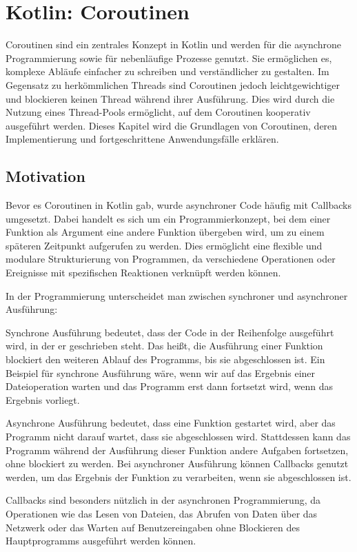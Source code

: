 \documentclass[fontsize=12pt,paper=a4,twoside=semi,parskip=half-,headsepline,headinclude]{scrreprt}
\begin{document}
\section{Kotlin: Coroutinen}

Coroutinen sind ein zentrales Konzept in Kotlin und werden für die asynchrone Programmierung sowie für nebenläufige Prozesse genutzt. Sie ermöglichen es, komplexe Abläufe einfacher zu schreiben und verständlicher zu gestalten. Im Gegensatz zu herkömmlichen Threads sind Coroutinen jedoch leichtgewichtiger und blockieren keinen Thread während ihrer Ausführung. Dies wird durch die Nutzung eines Thread-Pools ermöglicht, auf dem Coroutinen kooperativ ausgeführt werden. Dieses Kapitel wird die Grundlagen von Coroutinen, deren Implementierung und fortgeschrittene Anwendungsfälle erklären.

\subsection{Motivation}

Bevor es Coroutinen in Kotlin gab, wurde asynchroner Code häufig mit Callbacks umgesetzt. Dabei handelt es sich um ein Programmierkonzept, bei dem einer Funktion als Argument eine andere Funktion übergeben wird, um zu einem späteren Zeitpunkt aufgerufen zu werden. Dies ermöglicht eine flexible und modulare Strukturierung von Programmen, da verschiedene Operationen oder Ereignisse mit spezifischen Reaktionen verknüpft werden können. 

In der Programmierung unterscheidet man zwischen synchroner und asynchroner Aus\-füh\-rung:

Synchrone Ausführung bedeutet, dass der Code in der Reihenfolge ausgeführt wird, in der er geschrieben steht. Das heißt, die Ausführung einer Funktion blockiert den weiteren Ablauf des Programms, bis sie abgeschlossen ist. Ein Beispiel für synchrone Ausführung wäre, wenn wir auf das Ergebnis einer Dateioperation warten und das Programm erst dann fortsetzt wird, wenn das Ergebnis vorliegt.

Asynchrone Ausführung bedeutet, dass eine Funktion gestartet wird, aber das Programm nicht darauf wartet, dass sie abgeschlossen wird. Stattdessen kann das Programm während der Ausführung dieser Funktion andere Aufgaben fortsetzen, ohne blockiert zu werden. Bei asynchroner Ausführung können Callbacks genutzt werden, um das Ergebnis der Funktion zu verarbeiten, wenn sie abgeschlossen ist.

Callbacks sind besonders nützlich in der asynchronen Programmierung, da Operationen wie das Lesen von Dateien, das Abrufen von Daten über das Netzwerk oder das Warten auf Benutzereingaben ohne Blockieren des Hauptprogramms ausgeführt werden können.
\end{document}
